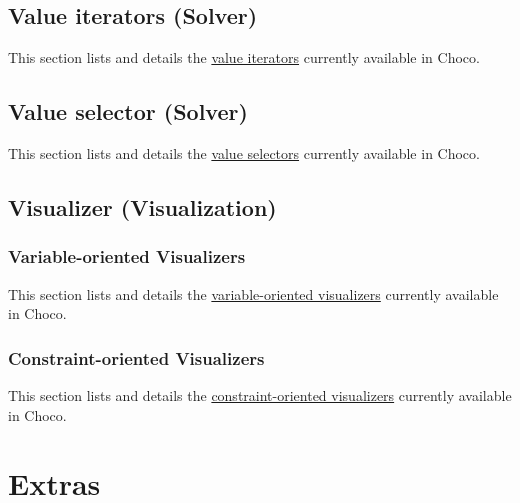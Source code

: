 \chapter{Value iterators (Solver)}\label{ch:valite}\hypertarget{ch:valite}{}
This section lists and details the \hyperlink{solver:valueiterator}{value iterators} currently available in Choco.





\chapter{Value selector (Solver)}\label{ch:valsel}\hypertarget{ch:valsel}{}
This section lists and details the \hyperlink{solver:valueselector}{value selectors} currently available in Choco.





%





\chapter{Visualizer (Visualization)}\label{ch:visualizer}\hypertarget{ch:visualizer}{}
\section{Variable-oriented Visualizers}\label{vov:visualizers}\hypertarget{vov:visualizers}{}
This section lists and details the \hyperlink{chocoandcpviz:visualizers}{variable-oriented visualizers} currently available in Choco.







\section{Constraint-oriented Visualizers}\label{cov:visualizers}\hypertarget{cov:visualizers}{}
This section lists and details the \hyperlink{chocoandcpviz:visualizers}{constraint-oriented visualizers} currently available in Choco.










\part{Extras}\label{ch:extra}\hypertarget{ch:extra}{}
%

